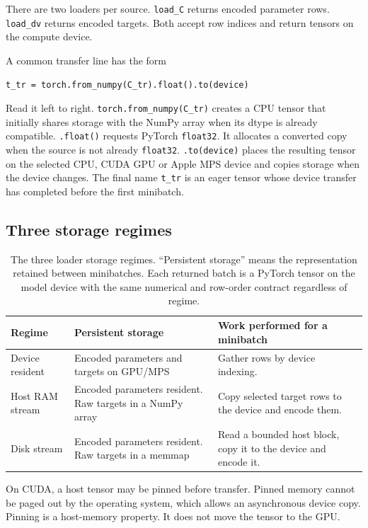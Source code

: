 \documentclass[10pt,aps,prd,twocolumn,nofootinbib]{revtex4-2}
\newcommand{\code}[1]{\texttt{#1}}
\begin{document}
There are two loaders per source.  \code{load\_C} returns encoded parameter
rows.  \code{load\_dv} returns encoded targets.  Both accept row indices and
return tensors on the compute device.

A common transfer line has the form
\begin{small}
\begin{verbatim}
t_tr = torch.from_numpy(C_tr).float().to(device)
\end{verbatim}
\end{small}
Read it left to right.  \code{torch.from\_numpy(C\_tr)} creates a CPU tensor
that initially shares storage with the NumPy array when its dtype is already
compatible.  \code{.float()} requests PyTorch \code{float32}.  It allocates a
converted copy when the source is not already \code{float32}.
\code{.to(device)} places the resulting tensor on the selected CPU, CUDA GPU
or Apple MPS device and copies storage when the device changes.  The final
name \code{t\_tr} is an eager tensor whose device transfer has completed before
the first minibatch.

\subsection{Three storage regimes}

\begin{table}[t]
\centering
\begin{tabular}{p{}p{}p{}}
\toprule
Regime & Persistent storage & Work performed for a minibatch \\
\midrule
Device resident & Encoded parameters and targets on GPU/MPS & Gather rows by
device indexing.  \\
Host RAM stream & Encoded parameters resident.  Raw targets in a NumPy array &
Copy selected target rows to the device and encode them.  \\
Disk stream & Encoded parameters resident.  Raw targets in a memmap & Read a
bounded host block, copy it to the device and encode it.  \\
\bottomrule
\end{tabular}
\caption{The three loader storage regimes.  ``Persistent storage'' means the
representation retained between minibatches.  Each returned batch is a
PyTorch tensor on the model device with the same numerical and row-order
contract regardless of regime.}
\label{tab:storage-regimes}
\end{table}

On CUDA, a host tensor may be pinned before transfer.  Pinned memory cannot be
paged out by the operating system, which allows an asynchronous device copy.
Pinning is a host-memory property.  It does not move the tensor to the GPU.
\end{document}
